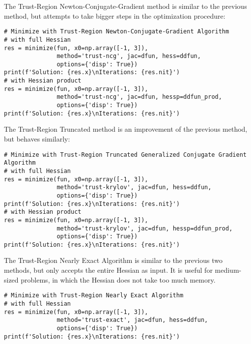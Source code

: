 \documentclass[12pt, a4paper]{article}
\begin{document}
The Trust-Region Newton-Conjugate-Gradient method is similar to the previous method, but attempts to take bigger steps in the optimization procedure:
\lstset{language=jupyter-python,label= ,caption= ,captionpos=b,numbers=none}
\begin{lstlisting}
# Minimize with Trust-Region Newton-Conjugate-Gradient Algorithm
# with full Hessian
res = minimize(fun, x0=np.array([-1, 3]),
               method='trust-ncg', jac=dfun, hess=ddfun,
               options={'disp': True})
print(f'Solution: {res.x}\nIterations: {res.nit}')
# with Hessian product
res = minimize(fun, x0=np.array([-1, 3]),
               method='trust-ncg', jac=dfun, hessp=ddfun_prod,
               options={'disp': True})
print(f'Solution: {res.x}\nIterations: {res.nit}')
\end{lstlisting}

The Trust-Region Truncated method is an improvement of the previous method, but behaves similarly:
\lstset{language=jupyter-python,label= ,caption= ,captionpos=b,numbers=none}
\begin{lstlisting}
# Minimize with Trust-Region Truncated Generalized Conjugate Gradient Algorithm
# with full Hessian
res = minimize(fun, x0=np.array([-1, 3]),
               method='trust-krylov', jac=dfun, hess=ddfun,
               options={'disp': True})
print(f'Solution: {res.x}\nIterations: {res.nit}')
# with Hessian product
res = minimize(fun, x0=np.array([-1, 3]),
               method='trust-krylov', jac=dfun, hessp=ddfun_prod,
               options={'disp': True})
print(f'Solution: {res.x}\nIterations: {res.nit}')
\end{lstlisting}

The Trust-Region Nearly Exact Algorithm is similar to the previous two methods, but only accepts the entire Hessian as input.
It is useful for medium-sized problems, in which the Hessian does not take too much memory.
\lstset{language=jupyter-python,label= ,caption= ,captionpos=b,numbers=none}
\begin{lstlisting}
# Minimize with Trust-Region Nearly Exact Algorithm
# with full Hessian
res = minimize(fun, x0=np.array([-1, 3]),
               method='trust-exact', jac=dfun, hess=ddfun,
               options={'disp': True})
print(f'Solution: {res.x}\nIterations: {res.nit}')
\end{lstlisting}
\end{document}
